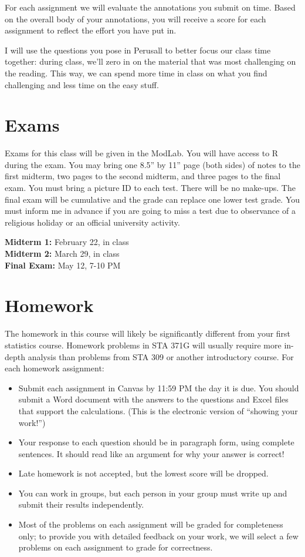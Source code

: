 \documentclass[12pt]{article}
\begin{document}
For each assignment we will evaluate the annotations you submit on time. Based on the overall body of your annotations, you will receive a score for each assignment to reflect the effort you have put in.

I will use the questions you pose in Perusall to better focus our class time together: during class, we'll zero in on the material that was most challenging on the reading.  This way, we can spend more time in class on what you find challenging and less time on the easy stuff.

\section*{Exams}

Exams for this class will be given in the ModLab.  You will have access to R during the exam.  You may bring one 8.5'' by 11'' page (both sides) of notes to the first midterm, two pages to the second midterm, and three pages to the final exam.  You must bring a picture ID to each test.  There will be no make-ups.  The final exam will be cumulative and the grade can replace one lower test grade.  You must inform me in advance if you are going to miss a test due to observance of a religious holiday or an official university activity.

\textbf{Midterm 1:} February 22, in class  \\
\textbf{Midterm 2:} March 29, in class  \\
\textbf{Final Exam:} May 12, 7-10 PM \\

\section*{Homework}

The homework in this course will likely be significantly different from your first statistics course.  Homework problems in STA 371G will usually require more in-depth analysis than problems from STA 309 or another introductory course.  For each homework assignment:
\begin{itemize}
\item Submit each assignment in Canvas by 11:59 PM the day it is due.  You should submit a Word document with the answers to the questions and Excel files that support the calculations.  (This is the electronic version of ``showing your work!'')
\item Your response to each question should be in paragraph form, using complete sentences.  It should read like an argument for why your answer is correct!
\item Late homework is not accepted, but the lowest score will be dropped.  
\item You can work in groups, but each person in your group must write up and submit their results independently.
\item Most of the problems on each assignment will be graded for completeness only; to provide you with detailed feedback on your work, we will select a few problems on each assignment to grade for correctness.
\end{itemize}
\end{document}
